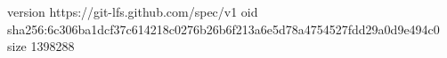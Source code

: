 version https://git-lfs.github.com/spec/v1
oid sha256:6c306ba1dcf37c614218c0276b26b6f213a6e5d78a4754527fdd29a0d9e494c0
size 1398288
